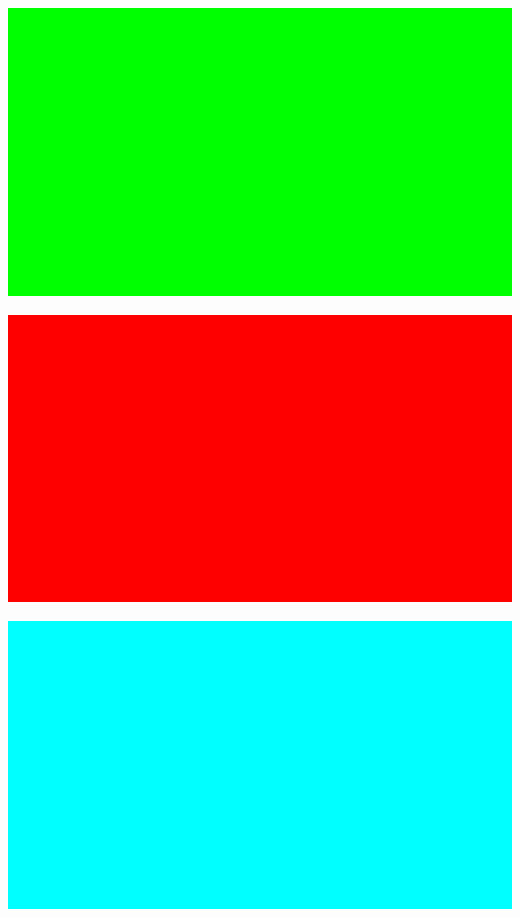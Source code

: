 \documentclass{article}
\begin{document}
\includegraphics[width=1\textwidth]{media/image12.png}

\includegraphics[width=1\textwidth]{media/image13.png}

\includegraphics[width=1\textwidth]{media/image14.png}
\end{document}
